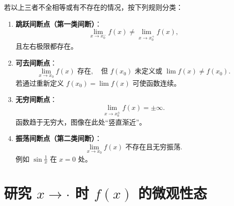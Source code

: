 \begin{enumerate}
          若以上三者不全相等或有不存在的情况，按下列规则分类：

          \begin{enumerate}
              \item \textbf{跳跃间断点（第一类间断）}：
                    \[
                        \lim_{x\to x_0^-}f(x) \neq \lim_{x\to x_0^+}f(x),
                    \]
                    且左右极限都存在。

              \item \textbf{可去间断点}：
                    \[
                        \lim_{x\to x_0}f(x) \text{ 存在}, \quad
                        \text{但 } f(x_0)\text{ 未定义或 }\lim f(x)\neq f(x_0).
                    \]
                    若通过重新定义 $f(x_0)=\lim f(x)$ 可使函数连续。

              \item \textbf{无穷间断点}：
                    \[
                        \lim_{x\to x_0^\pm}f(x)=\pm\infty.
                    \]
                    函数趋于无穷大，图像在此处“竖直渐近”。

              \item \textbf{振荡间断点（第二类间断）}：
                    \[
                        \lim_{x\to x_0}f(x) \text{ 不存在且无穷振荡}.
                    \]
                    例如 $\sin\frac{1}{x}$ 在 $x=0$ 处。
          \end{enumerate}
\end{enumerate}
\section{研究 $x \to \cdot$ 时 $f(x)$ 的微观性态}

